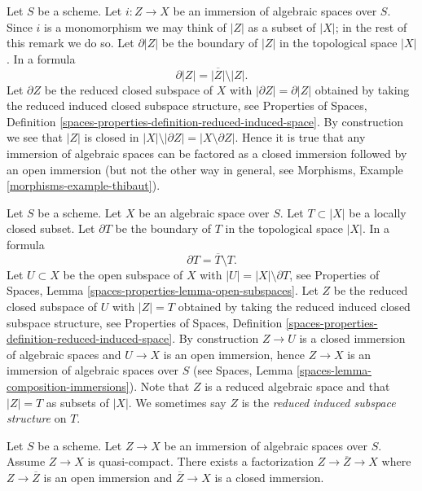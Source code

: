 \begin{remark}
\label{remark-immersion}
Let $S$ be a scheme. Let $i : Z \to X$ be an immersion of algebraic
spaces over $S$. Since $i$ is a monomorphism we may think of $|Z|$ as
a subset of $|X|$; in the rest of this remark we do so.
Let $\partial |Z|$ be the boundary of $|Z|$ in
the topological space $|X|$. In a formula
$$
\partial |Z| = \overline{|Z|} \setminus |Z|.
$$
Let $\partial Z$ be the reduced closed subspace of $X$ with
$|\partial Z| = \partial |Z|$
obtained by taking the reduced induced closed subspace structure, see
Properties of Spaces,
Definition \ref{spaces-properties-definition-reduced-induced-space}.
By construction we see that $|Z|$ is closed in
$|X| \setminus |\partial Z| = |X \setminus \partial Z|$.
Hence it is true that any immersion of algebraic spaces can be
factored as a closed immersion followed by an open immersion
(but not the other way in general, see
Morphisms, Example \ref{morphisms-example-thibaut}).
\end{remark}

\begin{remark}
\label{remark-space-structure-locally-closed-subset}
Let $S$ be a scheme. Let $X$ be an algebraic space over $S$.
Let $T \subset |X|$ be a locally closed subset.
Let $\partial T$ be the boundary of $T$ in
the topological space $|X|$. In a formula
$$
\partial T = \overline{T} \setminus T.
$$
Let $U \subset X$ be the open subspace of $X$ with
$|U| = |X| \setminus \partial T$, see
Properties of Spaces, Lemma \ref{spaces-properties-lemma-open-subspaces}.
Let $Z$ be the reduced closed subspace of $U$ with
$|Z| = T$ obtained by taking the reduced induced
closed subspace structure, see
Properties of Spaces,
Definition \ref{spaces-properties-definition-reduced-induced-space}.
By construction $Z \to U$ is a closed immersion of algebraic spaces
and $U \to X$ is an open immersion, hence
$Z \to X$ is an immersion of algebraic spaces over $S$ (see
Spaces, Lemma \ref{spaces-lemma-composition-immersions}).
Note that $Z$ is a reduced algebraic space and that
$|Z| = T$ as subsets of $|X|$. We sometimes say
$Z$ is the {\it reduced induced subspace structure} on $T$.
\end{remark}

\begin{lemma}
\label{lemma-factor-the-other-way}
Let $S$ be a scheme. Let $Z \to X$ be an immersion of algebraic spaces over
$S$. Assume $Z \to X$ is quasi-compact.
There exists a factorization $Z \to \overline{Z} \to X$ where
$Z \to \overline{Z}$ is an open immersion and $\overline{Z} \to X$
is a closed immersion.
\end{lemma}

